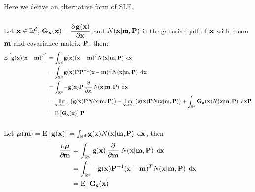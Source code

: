 \documentclass[a4paper,oneside,article]{memoir}
\begin{document}


\begin{table}[h]
	\centering
	
	\label{table:rmse4_1}
\end{table}





\clearpage

\subsection{}\label{sec:4_2}
Here we derive an alternative form of SLF.
\subsubsection{}\label{sec:4_2a}
Let $\mathbf{x}\in\mathbb{R}^d$, $\v{G}_\v{x}(\v{x})=\dpd{\v{g}(\v{x})}{\v{x}}$ and $N(\mathbf{x}|\mathbf{m},\mathbf{P})$ is the gaussian pdf of $\mathbf{x}$ with mean $\mathbf{m}$ and covariance matrix $\mathbf{P}$, then:
\begin{align}
	\E{\v{g}(\v{x})(\v{x}-\v{m})^T}&=\defint{\R^d}{}{\v{g}(\v{x})(\v{x}-\v{m})^TN(\v{x}|\v{m},\v{P})}{\v{x}}\\
	&=\defint{\R^d}{}{\v{g}(\v{x})\v{P}\v{P}^{-1}(\v{x}-\v{m})^TN(\v{x}|\v{m},\v{P})}{\v{x}}\\
	&=\defint{\R^d}{}{-\v{g}(\v{x})\v{P}\dpd{}{\v{x}}N(\v{x}|\v{m},\v{P})}{\v{x}}\\
	&=\lim_{\v{x}\to-\infty}\left(\v{g}(\v{x})\v{P}N(\v{x}|\v{m},\v{P})\right)-\lim_{\v{x}\to\infty}\left(\v{g}(\v{x})\v{P}N(\v{x}|\v{m},\v{P})\right)+\defint{\R^d}{}{\v{G}_{\v{x}}(\v{x})N(\v{x}|\v{m},\v{P})}{\v{x}}\v{P}\\
	&=\E{\v{G}_{\v{x}}(\v{x})}\v{P}
\end{align}

\subsubsection{}\label{sec:4_2b}
Let $\gv{\mu}(\v{m})=\E{\v{g}(\v{x})}=\defint{\R^d}{}{\v{g}(\v{x})N(\v{x}|\v{m},\v{P})}{\v{x}}$, then
\begin{align}
	\dpd{\gv{\mu}}{\v{m}}&=\defint{\R^d}{}{\v{g}(\v{x})\dpd{}{\v{m}}N(\v{x}|\v{m},\v{P})}{\v{x}}\\
	&=\defint{\R^d}{}{-\v{g}(\v{x})\v{P}^{-1}(\v{x}-\v{m})^TN(\v{x}|\v{m},\v{P})}{\v{x}}\\
	&=\E{\v{G}_{\v{x}}(\v{x})}
\end{align}
\end{document}
